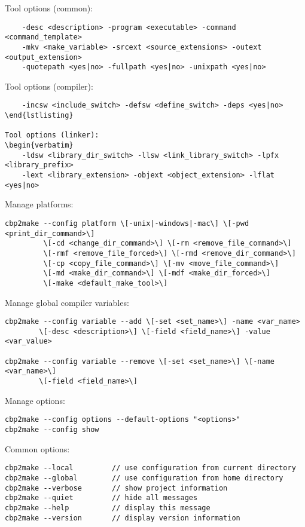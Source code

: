 Tool options (common):
\begin{verbatim}
    -desc <description> -program <executable> -command <command_template>
    -mkv <make_variable> -srcext <source_extensions> -outext <output_extension>
    -quotepath <yes|no> -fullpath <yes|no> -unixpath <yes|no>
\end{verbatim}

Tool options (compiler):
\begin{verbatim}
    -incsw <include_switch> -defsw <define_switch> -deps <yes|no>
\end{lstlisting}

Tool options (linker):
\begin{verbatim}
    -ldsw <library_dir_switch> -llsw <link_library_switch> -lpfx <library_prefix>
    -lext <library_extension> -objext <object_extension> -lflat <yes|no>
\end{verbatim}

Manage platforms:
\begin{verbatim}
cbp2make --config platform \[-unix|-windows|-mac\] \[-pwd <print_dir_command>\]
         \[-cd <change_dir_command>\] \[-rm <remove_file_command>\]
         \[-rmf <remove_file_forced>\] \[-rmd <remove_dir_command>\]
         \[-cp <copy_file_command>\] \[-mv <move_file_command>\]
         \[-md <make_dir_command>\] \[-mdf <make_dir_forced>\]
         \[-make <default_make_tool>\]         
\end{verbatim}

\begin{samepage}
Manage global compiler variables:
\begin{verbatim}
cbp2make --config variable --add \[-set <set_name>\] -name <var_name>
        \[-desc <description>\] \[-field <field_name>\] -value <var_value>
        
cbp2make --config variable --remove \[-set <set_name>\] \[-name <var_name>\]
        \[-field <field_name>\]
\end{verbatim}
\end{samepage}

Manage options:
\begin{verbatim}
cbp2make --config options --default-options "<options>"    
cbp2make --config show
\end{verbatim}

Common options:
\begin{verbatim}
cbp2make --local         // use configuration from current directory
cbp2make --global        // use configuration from home directory
cbp2make --verbose       // show project information
cbp2make --quiet         // hide all messages
cbp2make --help          // display this message
cbp2make --version       // display version information
\end{verbatim}

